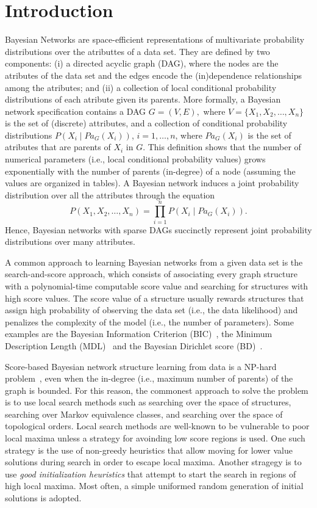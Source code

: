 \section{Introduction}
\label{sec:introduction}

Bayesian Networks are space-efficient representations of multivariate
probability distributions over the atributtes of a data set. They are
defined by two components: (i) a directed acyclic graph (DAG), where the
nodes are the atributes of the data set and the edges encode the
(in)dependence relationships among the atributes; and (ii) a collection
of local conditional probability distributions of each atribute given
its parents. More formally, a Bayesian network specification contains a
DAG \( G = ( V , E ), \)
where $V = \{ X_1 , X_2 , \ldots , X_n \}$ is the set of (discrete)
attributes, and a collection of conditional probability distributions
\( P( X_i \mid {Pa}_G( X_i ) ) \),
$i=1,\ldots,n$, where ${Pa}_G( X_i )$ is the set of atributes that are
parents of $X_i$ in $G$. This definition shows that the number of
numerical parameters (i.e., local conditional probability values) grows
exponentially with the number of parents (in-degree) of a node (assuming
the values are organized in tables). A Bayesian network induces a joint
probability distribution over all the attributes through the equation
\[ P( X_1 , X_2 , \ldots , X_n ) = \prod_{i=1}^{n} P( X_i \mid {Pa}_G( X_i ) ).  \]
Hence, Bayesian networks with sparse DAGs succinctly represent joint
probability distributions over many attributes.

A common approach to learning Bayesian networks from a given data set is
the search-and-score approach, which consists of associating every graph
structure with a polynomial-time computable score value and searching
for structures with high score values. The score value of a structure
usually rewards structures that assign high probability of observing the
data set (i.e., the data likelihood) and penalizes the complexity of the
model (i.e., the number of parameters). Some examples are the Bayesian
Information Criterion (BIC)~\cite{BIC91}, the Minimum Description Length
(MDL)~\cite{MDL94} and the Bayesian Dirichlet score (BD)~\cite{BD95}.


Score-based Bayesian network structure learning from data is a NP-hard
problem~\cite{MSResearch04}, even when the in-degree (i.e., maximum
number of parents) of the graph is bounded. For this reason, the
commonest approach to solve the problem is to use local search methods
such as searching over the space of structures, searching over Markov
equivalence classes, and searching over the space of topological
orders. Local search methods are well-known to be vulnerable to poor
local maxima unless a strategy for avoinding low score regions is
used. One such strategy is the use of non-greedy heuristics that allow
moving for lower value solutions during search in order to escape local
maxima. Another stragegy is to use \emph{good initialization heuristics}
that attempt to start the search in regions of high local maxima. Most
often, a simple uniformed random generation of initial solutions is
adopted.

